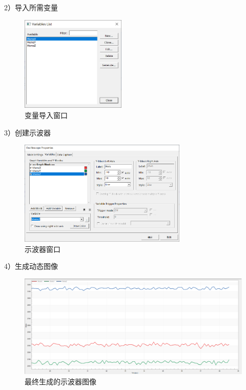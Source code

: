 \par{2）导入所需变量}

\begin{figure}[H]
\centering
\includegraphics[width=5cm]{figure/3.1.2.png}
\caption{变量导入窗口} \label{fig:3.1.2}
\end{figure}

\par{3）创建示波器}

\begin{figure}[H]
\centering
\includegraphics[width=8cm]{figure/3.1.3.png}
\caption{示波器窗口} \label{fig:3.1.3}
\end{figure}

\par{4）生成动态图像}

\begin{figure}[H]
\centering
\includegraphics[width=12cm]{figure/3.1.4.png}
\caption{最终生成的示波器图像} \label{fig:3.1.4}
\end{figure}
